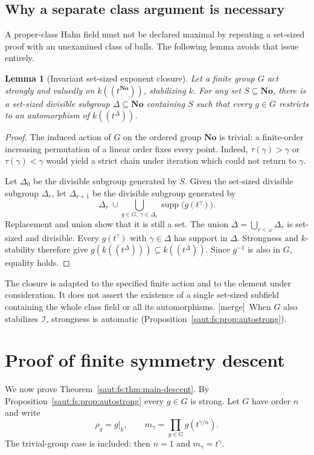\documentclass[11pt]{article}
\newtheorem{lemma}[theorem]{Lemma}
\theoremstyle{definition}
\theoremstyle{remark}
\newcommand{\No}{\mathbf{No}}
\newcommand{\supp}{\operatorname{supp}}
\newcommand{\Ineg}{\mathcal I}
\newcommand{\mergetag}{\textup{[merge]}}
\numberwithin{equation}{section}
\begin{document}
\subsection{Why a separate class argument is necessary}

A proper-class Hahn field must not be declared maximal by repeating a set-sized
proof with an unexamined class of balls. The following lemma avoids that issue
entirely.

\begin{lemma}[Invariant set-sized exponent closure]\label{saut:fs:lem:local}
Let a finite group $G$ act strongly and valuedly on $k((t^{\No}))$, stabilizing $k$.
For any set $S\subseteq\No$, there is a set-sized divisible subgroup
$\Delta\subseteq\No$ containing $S$ such that every $g\in G$ restricts to an
automorphism of $k((t^\Delta))$.
\end{lemma}
\begin{proof}
The induced action of $G$ on the ordered group $\No$ is trivial: a finite-order
increasing permutation of a linear order fixes every point. Indeed,
$\tau(\gamma)>\gamma$ or $\tau(\gamma)<\gamma$ would yield a strict chain under
iteration which could not return to $\gamma$.

Let $\Delta_0$ be the divisible subgroup generated by $S$. Given the set-sized
divisible subgroup $\Delta_r$, let $\Delta_{r+1}$ be the divisible subgroup
generated by
\[
 \Delta_r\ \cup\!\bigcup_{g\in G,\ \gamma\in\Delta_r}\supp\bigl(g(t^\gamma)\bigr).
\]
Replacement and union show that it is still a set. The union
$\Delta=\bigcup_{r<\omega}\Delta_r$ is set-sized and divisible. Every $g(t^\gamma)$
with $\gamma\in\Delta$ has support in $\Delta$. Strongness and $k$-stability
therefore give $g(k((t^\Delta)))\subseteq k((t^\Delta))$. Since $g^{-1}$ is also in
$G$, equality holds.
\end{proof}

The closure is adapted to the specified finite action and to the element under
consideration. It does not assert the existence of a single set-sized subfield
containing the whole class field or all its automorphisms. \mergetag\ When $G$ also
stabilizes $\Ineg$, strongness is automatic
(Proposition~\ref{saut:fs:prop:autostrong}).

\section{Proof of finite symmetry descent}\label{saut:fs:sec:norm}

We now prove Theorem~\ref{saut:fs:thm:main-descent}. By
Proposition~\ref{saut:fs:prop:autostrong} every $g\in G$ is strong. Let $G$ have
order $n$ and write
\[
 \rho_g=g|_k,\qquad m_\gamma=\prod_{g\in G}g(t^{\gamma/n}).
\]
The trivial-group case is included: then $n=1$ and $m_\gamma=t^\gamma$.
\end{document}
